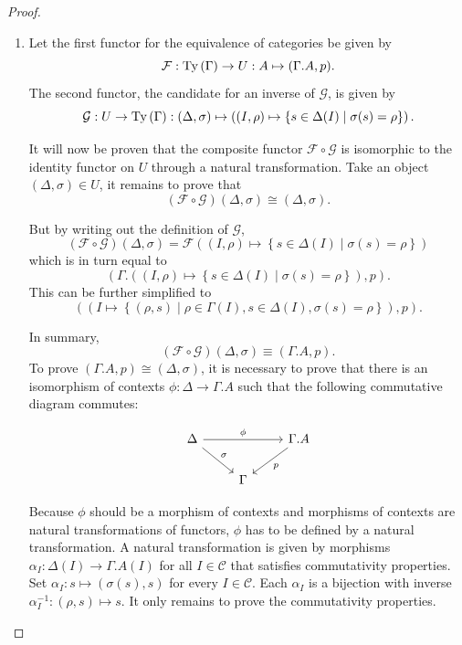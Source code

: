 \documentclass[12pt,a4paper,twoside,xetex]{book} %
\begin{document}
\begin{proof}

\begin{enumerate}
\item Let the first functor for the equivalence of categories be given by  
$$\mathcal{F}: \text{Ty}\left(\Gamma\right) \rightarrow  U : A \mapsto (\Gamma . A, p).$$ The 
second functor, the candidate for an inverse of $\mathcal{G}$, is given by  
$$\mathcal{G} : U \rightarrow \text{Ty}\left(\Gamma\right): (\Delta , \sigma) \mapsto \left( 
(I,\rho) \mapsto \left\{ s \in \Delta (I) \mid \sigma (s) = \rho \right\} 
\right).$$ 

It will now be proven that the composite functor $\mathcal{F} \circ 
\mathcal{G}$ is isomorphic to the identity functor on $U$ through a natural 
transformation. Take an object $(\Delta, \sigma) \in U$, it remains to prove 
that $$(\mathcal{F} \circ \mathcal{G})(\Delta , \sigma) \cong (\Delta, 
\sigma).$$ 

But by writing out the definition of $\mathcal{G}$, $$(\mathcal{F} 
\circ \mathcal{G})(\Delta , \sigma) = \mathcal{F}((I,\rho) \mapsto \left\{ s 
\in \Delta (I) \mid \sigma (s) = \rho \right\})$$ which is in turn equal to 
$$\left(\Gamma . \left((I,\rho) \mapsto \left\{ s \in \Delta (I) \mid \sigma 
(s) = \rho \right\} \right), p \right).$$ This can be further simplified to  $$ 
((I \mapsto  \left\{ (\rho, s ) \mid \rho \in \Gamma (I), s \in \Delta (I), 
\sigma (s) = \rho \right\}), p ).$$

In summary,  $$(\mathcal{F} \circ 
\mathcal{G})(\Delta , \sigma) \equiv \left(\Gamma . A, p \right).$$  To prove 
$\left(\Gamma . A, p \right) \cong (\Delta, \sigma)$, it is necessary to prove 
that there is an isomorphism of contexts $\phi : \Delta \rightarrow \Gamma . A$ 
such that the following commutative diagram commutes:

\[ \begin{tikzcd}
\Delta \arrow[dr, "\sigma"] \arrow[rr, "\phi"]
& & \Gamma . A
\arrow[dl, "p"] \\
& \Gamma  %
\end{tikzcd}
\]

Because $\phi$ should be a morphism of contexts and morphisms of contexts are 
natural transformations of functors, $\phi$ has to be defined by a natural 
transformation. A natural transformation is given by morphisms $\alpha_I : 
\Delta(I) \rightarrow \Gamma . A (I)$ for all $I \in \mathcal{C}$ that 
satisfies commutativity properties. Set  $\alpha_I: s \mapsto ( \sigma (s) , 
s)$ for every $I \in \mathcal{C}$. Each $\alpha_I$ is a bijection with inverse 
$\alpha_I^{-1}: (\rho, s) \mapsto s$. It only remains to prove the 
commutativity properties.


\end{enumerate}
\end{proof}
\end{document}

